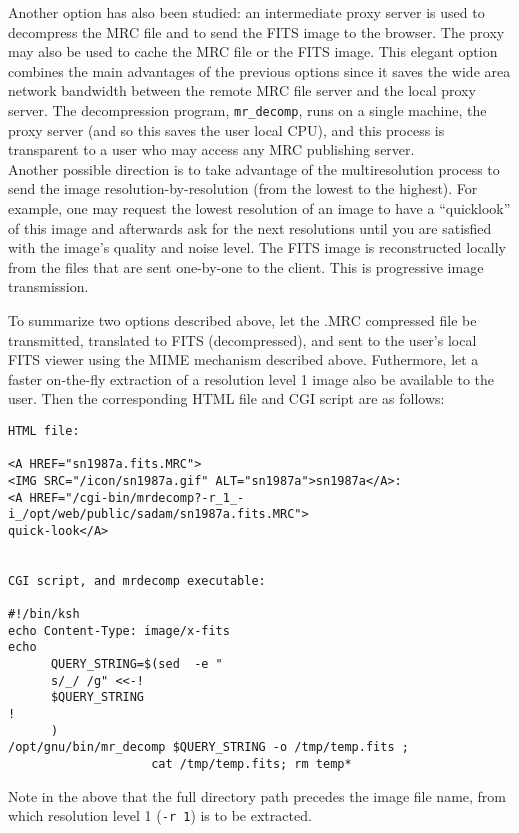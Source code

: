  
         Another option has also been studied: an intermediate proxy server
 is used to decompress the MRC file and
 to send the FITS image to the browser. The proxy may also be used to cache
 the MRC file or the FITS image. This elegant option combines the main
 advantages of the previous options since it saves the wide area network
 bandwidth between the remote MRC file server and the local proxy server.
 The decompression program, \verb+mr_decomp+, 
runs on a single machine, the proxy server
 (and so this saves the user local CPU), and this process 
 is transparent to a user who may access any MRC
 publishing server.\\
 
        Another possible direction is to take advantage of the multiresolution
 process  to send the image resolution-by-resolution
 (from the lowest to the highest). For example, one  may request
 the lowest resolution of an image to have a ``quicklook'' of this image and
 afterwards ask for the next resolutions until you are satisfied with
 the image's quality and noise level. The FITS image is reconstructed locally
 from the files that are sent one-by-one to the client.  This is progressive
image transmission.

To summarize two options described above, let the .MRC compressed file be
transmitted, translated to FITS (decompressed), and sent to the user's local
FITS viewer using the MIME mechanism described above.  Futhermore, let a 
faster on-the-fly extraction of a resolution  level 1  image also be available
to the user.  Then the corresponding HTML file and CGI script are as 
follows:

\begin{verbatim}
HTML file:

<A HREF="sn1987a.fits.MRC">
<IMG SRC="/icon/sn1987a.gif" ALT="sn1987a">sn1987a</A>:  
<A HREF="/cgi-bin/mrdecomp?-r_1_-i_/opt/web/public/sadam/sn1987a.fits.MRC">
quick-look</A>


CGI script, and mrdecomp executable:

#!/bin/ksh
echo Content-Type: image/x-fits
echo
      QUERY_STRING=$(sed  -e "
      s/_/ /g" <<-!
      $QUERY_STRING
!
      )
/opt/gnu/bin/mr_decomp $QUERY_STRING -o /tmp/temp.fits ; 
                    cat /tmp/temp.fits; rm temp*
\end{verbatim}

Note in the above that the full directory path precedes the image file name,
from which resolution level 1 (\verb+-r 1+) is to be extracted.  

